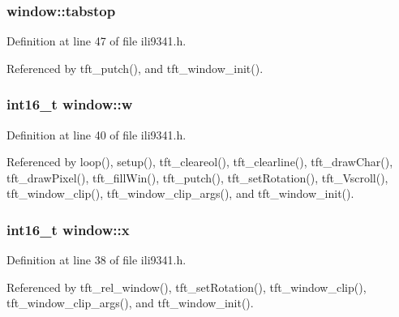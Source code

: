 \subsubsection[{\texorpdfstring{tabstop}{tabstop}}]{ window\+::tabstop}\hypertarget{structwindow_a88d2836d45dd428d8fadfd703f0f965f}{}\label{structwindow_a88d2836d45dd428d8fadfd703f0f965f}


Definition at line 47 of file ili9341.\+h.



Referenced by tft\+\_\+putch(), and tft\+\_\+window\+\_\+init().

\subsubsection[{\texorpdfstring{w}{w}}]{\setlength{\rightskip}{0pt plus 5cm}int16\+\_\+t window\+::w}\hypertarget{structwindow_ad89fdeb11ce94e2e7501f7290372d6ae}{}\label{structwindow_ad89fdeb11ce94e2e7501f7290372d6ae}


Definition at line 40 of file ili9341.\+h.



Referenced by loop(), setup(), tft\+\_\+cleareol(), tft\+\_\+clearline(), tft\+\_\+draw\+Char(), tft\+\_\+draw\+Pixel(), tft\+\_\+fill\+Win(), tft\+\_\+putch(), tft\+\_\+set\+Rotation(), tft\+\_\+\+Vscroll(), tft\+\_\+window\+\_\+clip(), tft\+\_\+window\+\_\+clip\+\_\+args(), and tft\+\_\+window\+\_\+init().

\subsubsection[{\texorpdfstring{x}{x}}]{\setlength{\rightskip}{0pt plus 5cm}int16\+\_\+t window\+::x}\hypertarget{structwindow_a879b99940dfc34772f0257f54c67b817}{}\label{structwindow_a879b99940dfc34772f0257f54c67b817}


Definition at line 38 of file ili9341.\+h.



Referenced by tft\+\_\+rel\+\_\+window(), tft\+\_\+set\+Rotation(), tft\+\_\+window\+\_\+clip(), tft\+\_\+window\+\_\+clip\+\_\+args(), and tft\+\_\+window\+\_\+init().

